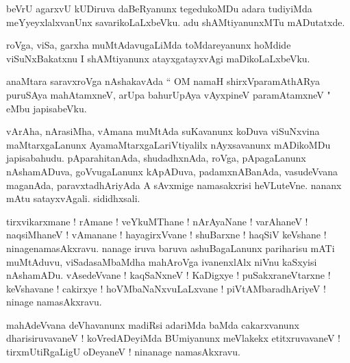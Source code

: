 \documentclass{article}
\begin{document}
\begin{mn}%
beVrU agarxvU kUDiruva daBeRyanunx tegedukoMDu adara tudiyiMda meYyeyxlalxvanUnx savarikoLaLxbeVku. 
adu shAMtiyanunxMTu mADutatxde.
\end{mn}

\begin{mn}%
roVga, viSa, garxha muMtAdavugaLiMda toMdareyanunx hoMdide viSuNxBakatxnu I shAMtiyanunx 
atayxgatayxvAgi maDikoLaLxbeVku.
\end{mn}

\begin{mn}%
anaMtara saravxroVga nAshakavAda `` OM namaH shirxVparamAthARya puruSAya mahAtamxneV, arUpa 
bahurUpAya vAyxpineV paramAtamxneV " eMbu japisabeVku.
\end{mn}

\begin{mn}%
vArAha, nArasiMha, vAmana muMtAda suKavanunx koDuva viSuNxvina maMtarxgaLanunx 
AyamaMtarxgaLariVtiyalilx nAyxsavanunx mADikoMDu japisabahudu. pAparahitanAda, shudadhxnAda, 
roVga, pApagaLanunx nAshamADuva, goVvugaLanunx kApADuva, padamxnABanAda, vasudeVvana maganAda, 
paravxtadhAriyAda A sAvxmige namasakxrisi heVLuteVne. nananx mAtu satayxvAgali. sididhxsali.
\end{mn}

\begin{mn}%
tirxvikarxmane ! rAmane ! veYkuMThane ! nArAyaNane ! varAhaneV ! naqsiMhaneV ! vAmanane ! 
hayagirxVvane ! shuBarxne ! haqSiV keVshane ! ninagenamasAkxravu. nanage iruva baruva 
ashuBagaLanunx pariharisu mATi muMtAduvu, viSadasaMbaMdha mahAroVga ivanenxlAlx niVnu kaSxyisi 
nAshamADu. vAsedeVvane ! kaqSaNxneV ! KaDigxye ! puSakxraneVtarxne ! keVshavane ! cakirxye ! 
hoVMbaNaNxvuLaLxvane ! piVtAMbaradhAriyeV ! ninage namasAkxravu.
\end{mn}

\begin{mn}%
mahAdeVvana deVhavanunx madiRsi adariMda baMda cakarxvanunx dharisiruvavaneV ! koVredADeyiMda 
BUmiyanunx meVlakekx etitxruvavaneV ! tirxmUtiRgaLigU oDeyaneV ! ninanage namasAkxravu.
\end{mn}
\end{document}
